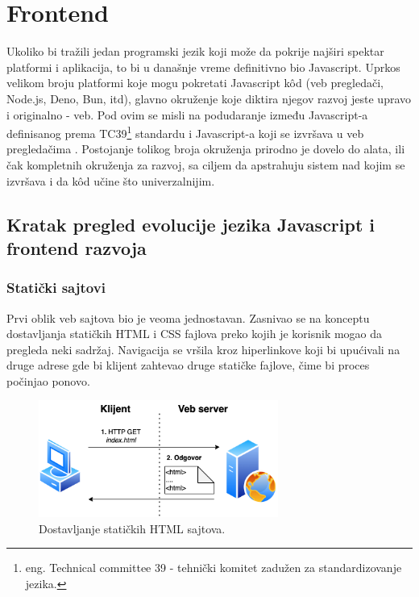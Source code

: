 \documentclass[12pt,oneside]{memoir}
\begin{document}
    






\chapter{Frontend}

Ukoliko bi tražili jedan programski jezik koji može da pokrije najširi spektar platformi i aplikacija, to bi u današnje vreme definitivno bio Javascript. Uprkos velikom broju platformi koje mogu pokretati Javascript k\^{o}d (veb pregledači, Node.js, Deno, Bun, itd), glavno okruženje koje diktira njegov razvoj jeste upravo i originalno - veb. Pod ovim se misli na podudaranje između Javascript-a definisanog prema TC39\footnote{eng. Technical committee 39 - tehnički komitet zadužen za standardizovanje jezika.} standardu i Javascript-a koji se izvršava u veb pregledačima \cite{ydkjs}. Postojanje tolikog broja okruženja prirodno je dovelo do alata, ili čak kompletnih okruženja za razvoj, sa ciljem da apstrahuju sistem nad kojim se izvršava i da k\^{o}d učine što univerzalnijim.


\section{Kratak pregled evolucije jezika Javascript i frontend razvoja}

\subsection{Statički sajtovi}
Prvi oblik veb sajtova bio je veoma jednostavan. Zasnivao se na konceptu dostavljanja statičkih HTML i CSS fajlova preko kojih je korisnik mogao da pregleda neki sadržaj. Navigacija se vršila kroz hiperlinkove koji bi upućivali na druge adrese gde bi klijent zahtevao druge statičke fajlove, čime bi proces počinjao ponovo.

\begin{figure}[h]
  \centering
  \includegraphics[width=0.7\textwidth]{docs/images/ch_4/frontend-dev-phase0.png} 
  \caption{Dostavljanje statičkih HTML sajtova.}
  \label{fig:sample}
\end{figure}
\end{document}
